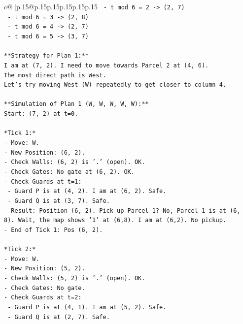 \documentclass{article}
\begin{document}
{\begin{supertabular}{c@{$\;$}|p{.15\linewidth}@{}p{.15\linewidth}p{.15\linewidth}p{.15\linewidth}p{.15\linewidth}p{.15\linewidth}}
{{{\texttt{  {-} t mod 6 = 2 {-}> (2, 7)} \\
\texttt{  {-} t mod 6 = 3 {-}> (2, 8)} \\
\texttt{  {-} t mod 6 = 4 {-}> (2, 7)} \\
\texttt{  {-} t mod 6 = 5 {-}> (3, 7)} \\
\\ 
\texttt{**Strategy for Plan 1:**} \\
\texttt{I am at (7, 2). I need to move towards Parcel 2 at (4, 6).} \\
\texttt{The most direct path is West.} \\
\texttt{Let's try moving West (W) repeatedly to get closer to column 4.} \\
\\ 
\texttt{**Simulation of Plan 1 (W, W, W, W, W):**} \\
\texttt{Start: (7, 2) at t=0.} \\
\\ 
\texttt{*Tick 1:*} \\
\texttt{{-} Move: W.} \\
\texttt{{-} New Position: (6, 2).} \\
\texttt{{-} Check Walls: (6, 2) is '.' (open). OK.} \\
\texttt{{-} Check Gates: No gate at (6, 2). OK.} \\
\texttt{{-} Check Guards at t=1:} \\
\texttt{  {-} Guard P is at (4, 2). I am at (6, 2). Safe.} \\
\texttt{  {-} Guard Q is at (3, 7). Safe.} \\
\texttt{{-} Result: Position (6, 2). Pick up Parcel 1? No, Parcel 1 is at (6, 8). Wait, the map shows '1' at (6,8). I am at (6,2). No pickup.} \\
\texttt{{-} End of Tick 1: Pos (6, 2).} \\
\\ 
\texttt{*Tick 2:*} \\
\texttt{{-} Move: W.} \\
\texttt{{-} New Position: (5, 2).} \\
\texttt{{-} Check Walls: (5, 2) is '.' (open). OK.} \\
\texttt{{-} Check Gates: No gate.} \\
\texttt{{-} Check Guards at t=2:} \\
\texttt{  {-} Guard P is at (4, 1). I am at (5, 2). Safe.} \\
\texttt{  {-} Guard Q is at (2, 7). Safe.} \\
}}}
\end{supertabular}}
\end{document}
